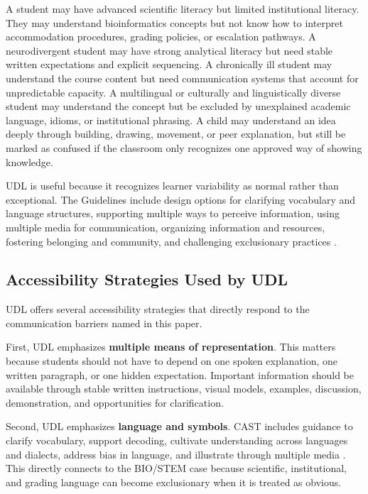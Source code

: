 \documentclass[12pt]{article}
\begin{document}
A student may have advanced scientific literacy but limited institutional literacy. They may understand bioinformatics concepts but not know how to interpret accommodation procedures, grading policies, or escalation pathways. A neurodivergent student may have strong analytical literacy but need stable written expectations and explicit sequencing. A chronically ill student may understand the course content but need communication systems that account for unpredictable capacity. A multilingual or culturally and linguistically diverse student may understand the concept but be excluded by unexplained academic language, idioms, or institutional phrasing. A child may understand an idea deeply through building, drawing, movement, or peer explanation, but still be marked as confused if the classroom only recognizes one approved way of showing knowledge.

UDL is useful because it recognizes learner variability as normal rather than exceptional. The Guidelines include design options for clarifying vocabulary and language structures, supporting multiple ways to perceive information, using multiple media for communication, organizing information and resources, fostering belonging and community, and challenging exclusionary practices \citep{cast2024udl}.

\subsection*{Accessibility Strategies Used by UDL}

UDL offers several accessibility strategies that directly respond to the communication barriers named in this paper.

First, UDL emphasizes \textbf{multiple means of representation}. This matters because students should not have to depend on one spoken explanation, one written paragraph, or one hidden expectation. Important information should be available through stable written instructions, visual models, examples, discussion, demonstration, and opportunities for clarification.

Second, UDL emphasizes \textbf{language and symbols}. CAST includes guidance to clarify vocabulary, support decoding, cultivate understanding across languages and dialects, address bias in language, and illustrate through multiple media \citep{cast2024udl}. This directly connects to the BIO/STEM case because scientific, institutional, and grading language can become exclusionary when it is treated as obvious.
\end{document}
